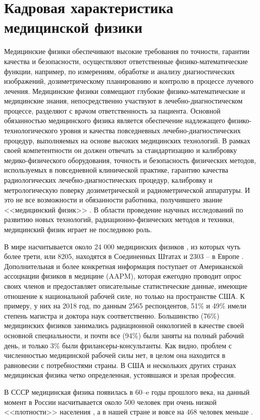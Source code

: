 
\section{Кадровая характеристика медицинской физики}
Медицинские физики обеспечивают высокие требования по точности, гарантии качества и безопасности, осуществляют ответственные физико-математические функции, например, по измерениям, обработке и анализу диагностических изображений, дозиметрическому планированию и контролю в процессе лучевого лечения. Медицинские физики совмещают глубокие физико-математические и медицинские знания, непосредственно участвуют в лечебно-диагностическом процессе, разделяют с врачом ответственность за пациента. Основной обязанностью медицинского физика является обеспечение надлежащего физико-технологического уровня и качества повседневных лечебно-диагностических процедур, выполняемых на основе высоких медицинских технологий. В рамках своей компетентности он должен отвечать за стандартизацию и калибровку медико-физического оборудования, точность и безопасность физических методов, используемых в повседневной клинической практике, гарантию качества радиологических лечебно-диагностических процедур, калибровку и метрологическую поверку дозиметрической и радиометрической аппаратуры. И это не все возможности и обязанности работника, получившего звание <<медицинский физик>> \cite{RP174}. В области проведение научных исследований по развитию новых технологий, радиационно-физических методов и техники, медицинский физик играет не последнюю роль.

В мире насчитывается около 24 000 медицинских физиков \cite{IOMP}, из которых чуть более трети, или 8205, находятся в Соединенных Штатах \cite{AAPM1} и 2303 -- в Европе \cite{Lievens}. Дополнительная и более конкретная информация поступает от Американской ассоциации физиков в медицине (AAPM), которая ежегодно проводит опрос своих членов и предоставляет описательные статистические данные, имеющие отношение к национальной рабочей силе, но только на пространстве США. К примеру, у них на 2018 год, по данным 2565 респондентов, 51\% и 49\% имели степень магистра и доктора наук соответственно. Большинство (76\%)  медицинских физиков занимались радиационной онкологией в качестве своей основной специальности, и почти все (94\%) были заняты на полный рабочий день, и только 3\% были фрилансеры-консультанты. Как видно, проблем с численностью медицинской рабочей силы нет, в целом она находится в равновесии с потребностями страны. В США и нескольких других странах медицинская физика четко определенная, устоявшаяся и зрелая профессия. 

В СССР медицинская физика появилась в 60--e годы прошлого века, на данный момент в России насчитывается около 500 человек при очень низкой <<плотности>> населения \cite{Костылёв}, а в нашей стране и вовсе на 468 человек меньше \cite{Тарутин}. 


